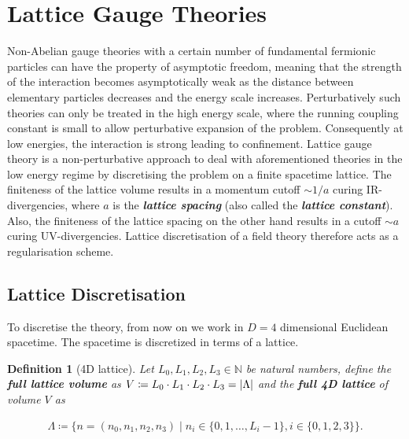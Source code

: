\documentclass{article}
\theoremstyle{plain} %
\newtheorem{definition}{Definition}[section]
\theoremstyle{convention} %
\theoremstyle{remark} %
\def\df#1{\textbf{\textit{#1}}}
\numberwithin{equation}{section}
\begin{document}
\section{Lattice Gauge Theories}

Non-Abelian gauge theories with a certain number of fundamental fermionic particles can have the property of asymptotic freedom, meaning that the strength of the interaction becomes asymptotically weak as the distance between elementary particles decreases and the energy scale increases. Perturbatively such theories can only be treated in the high energy scale, where the running coupling constant is small to allow perturbative expansion of the problem. Consequently at low energies, the interaction is strong leading to confinement. Lattice gauge theory is a non-perturbative approach to deal with aforementioned theories in the low energy regime by discretising the problem on a finite spacetime lattice. The finiteness of the lattice volume results in a momentum cutoff $\sim 1/a$ curing IR-divergencies, where $a$ is the \df{lattice spacing} (also called the \df{lattice constant}). Also, the finiteness of the lattice spacing on the other hand results in a cutoff $\sim a$ curing UV-divergencies. Lattice discretisation of a field theory therefore acts as a regularisation scheme.

\subsection{Lattice Discretisation}

To discretise the theory, from now on we work in $D=4$ dimensional Euclidean spacetime. The spacetime is discretized in terms of a lattice.

\begin{definition}[4D lattice]

Let $L_0, L_1, L_2, L_3 \in \mathbb{N}$ be natural numbers, define the \df{full lattice volume} as $V \coloneqq L_0 \cdot L_1 \cdot L_2 \cdot L_3 = \abs{\Lambda}$ and the \df{full 4D lattice} of volume $V$ as

\begin{align*}
    \Lambda \coloneqq \{ n = (n_0, n_1, n_2, n_3) \mid n_i \in \{0, 1, \dots, L_i - 1 \}, i \in \{0,1,2,3\} \}.
\end{align*}

\end{definition}
\end{document}
